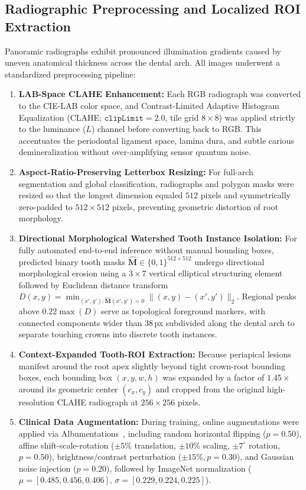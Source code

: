 \documentclass[review]{elsarticle}
\begin{document}
\subsection{Radiographic Preprocessing and Localized ROI Extraction}
\label{sec:preprocessing}
Panoramic radiographs exhibit pronounced illumination gradients caused by uneven anatomical thickness across the dental arch. All images underwent a standardized preprocessing pipeline:
\begin{enumerate}
    \item \textbf{LAB-Space CLAHE Enhancement:} Each RGB radiograph was converted to the CIE-LAB color space, and Contrast-Limited Adaptive Histogram Equalization (CLAHE; $\texttt{clipLimit}=2.0$, tile grid $8 \times 8$) was applied strictly to the luminance ($L$) channel before converting back to RGB. This accentuates the periodontal ligament space, lamina dura, and subtle carious demineralization without over-amplifying sensor quantum noise.
    \item \textbf{Aspect-Ratio-Preserving Letterbox Resizing:} For full-arch segmentation and global classification, radiographs and polygon masks were resized so that the longest dimension equaled $512$ pixels and symmetrically zero-padded to $512 \times 512$ pixels, preventing geometric distortion of root morphology.
    \item \textbf{Directional Morphological Watershed Tooth Instance Isolation:} For fully automated end-to-end inference without manual bounding boxes, predicted binary tooth masks $\hat{\mathbf{M}} \in \{0,1\}^{512 \times 512}$ undergo directional morphological erosion using a $3 \times 7$ vertical elliptical structuring element followed by Euclidean distance transform $D(x,y) = \min_{(x',y'): \hat{\mathbf{M}}(x',y')=0} \|(x,y) - (x',y')\|_2$. Regional peaks above $0.22 \max(D)$ serve as topological foreground markers, with connected components wider than $38$\,px subdivided along the dental arch to separate touching crowns into discrete tooth instances.
    \item \textbf{Context-Expanded Tooth-ROI Extraction:} Because periapical lesions manifest around the root apex slightly beyond tight crown-root bounding boxes, each bounding box $(x, y, w, h)$ was expanded by a factor of $1.45\times$ around its geometric center $(c_x, c_y)$ and cropped from the original high-resolution CLAHE radiograph at $256 \times 256$ pixels.
    \item \textbf{Clinical Data Augmentation:} During training, online augmentations were applied via Albumentations~\cite{buslaev2020albumentations}, including random horizontal flipping ($p=0.50$), affine shift-scale-rotation ($\pm 5\%$ translation, $\pm 10\%$ scaling, $\pm 7^{\circ}$ rotation, $p=0.50$), brightness/contrast perturbation ($\pm 15\%, p=0.30$), and Gaussian noise injection ($p=0.20$), followed by ImageNet normalization ($\mu=[0.485, 0.456, 0.406]$, $\sigma=[0.229, 0.224, 0.225]$).
\end{enumerate}
\end{document}
